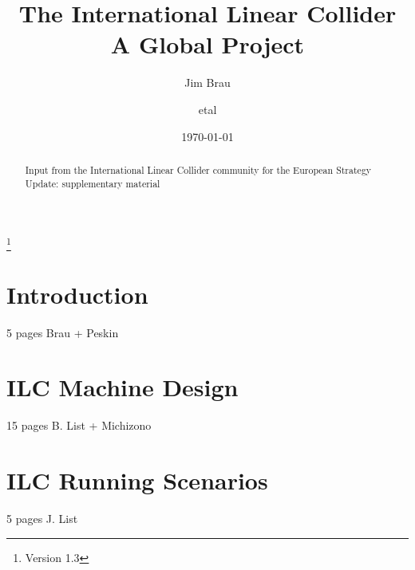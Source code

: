 \documentclass[%
 reprint,
 amsmath,amssymb,
 aps,
]{revtex4-1}
\begin{document}

\title{The International Linear Collider \\ A Global Project}%
\thanks{Version 1.3}%

\author{Jim Brau}
\author{etal}%
%


\date{\today}%

\begin{abstract}
Input from the International Linear Collider community for the European Strategy Update: supplementary material

\end{abstract}

\maketitle

\tableofcontents

\section{\label{sec:intro}Introduction}
   5 pages Brau + Peskin
   
   

   
\section{\label{sec:ilc}ILC Machine Design}

  15 pages B. List + Michizono
  

  
\section{\label{sec:runscenarios}ILC Running Scenarios  }
   5 pages J. List
   
\end{document}
